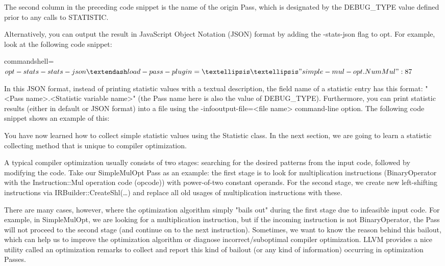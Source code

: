 The second column in the preceding code snippet is the name of the origin Pass, which is designated by the DEBUG\_TYPE value defined prior to any calls to STATISTIC.

Alternatively, you can output the result in JavaScript Object Notation (JSON) format by adding the -stats-json flag to opt. For example, look at the following code snippet:

\begin{tcblisting}{commandshell={}}
$ opt -stats -stats-json –load-pass-plugin=… …
{
	"simple-mul-opt.NumMul": 87
}
$
\end{tcblisting}

In this JSON format, instead of printing statistic values with a textual description, the field name of a statistic entry has this format: "<Pass name>.<Statistic variable name>" (the Pass name here is also the value of DEBUG\_TYPE). Furthermore, you can print statistic results (either in default or JSON format) into a file using the -infooutput-file=<file name> command-line option. The following code snippet shows an example of this:


You have now learned how to collect simple statistic values using the Statistic class. In the next section, we are going to learn a statistic collecting method that is unique to compiler optimization.


A typical compiler optimization usually consists of two stages: searching for the desired patterns from the input code, followed by modifying the code. Take our SimpleMulOpt Pass as an example: the first stage is to look for multiplication instructions (BinaryOperator with the Instruction::Mul operation code (opcode)) with power-of-two constant operands. For the second stage, we create new left-shifting instructions via IRBuilder::CreateShl(…) and replace all old usages of multiplication instructions with these.

There are many cases, however, where the optimization algorithm simply "bails out" during the first stage due to infeasible input code. For example, in SimpleMulOpt, we are looking for a multiplication instruction, but if the incoming instruction is not BinaryOperator, the Pass will not proceed to the second stage (and continue on to the next instruction). Sometimes, we want to know the reason behind this bailout, which can help us to improve the optimization algorithm or diagnose incorrect/suboptimal compiler optimization. LLVM provides a nice utility called an optimization remarks to collect and report this kind of bailout (or any kind of information) occurring in optimization Passes.

